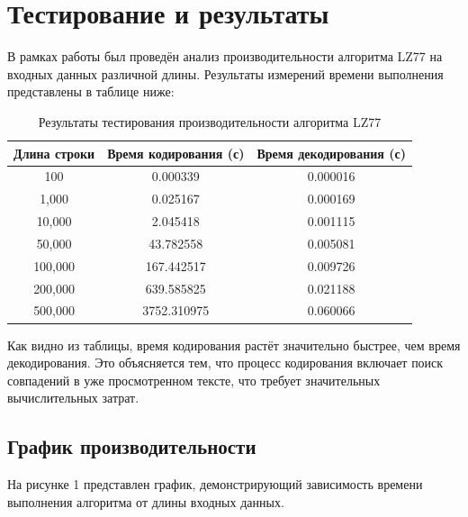 \section*{Тестирование и результаты}

В рамках работы был проведён анализ производительности алгоритма LZ77 на входных данных различной длины. Результаты измерений времени выполнения представлены в таблице ниже:

\begin{table}
\centering
\begin{tabular}{|c|c|c|}
\hline
\textbf{Длина строки} & \textbf{Время кодирования (с)} & \textbf{Время декодирования (с)} \\ \hline
100                  & 0.000339                       & 0.000016                         \\ \hline
1,000                & 0.025167                       & 0.000169                         \\ \hline
10,000               & 2.045418                       & 0.001115                         \\ \hline
50,000               & 43.782558                      & 0.005081                         \\ \hline
100,000              & 167.442517                     & 0.009726                         \\ \hline
200,000              & 639.585825                     & 0.021188                         \\ \hline
500,000              & 3752.310975                    & 0.060066                         \\ \hline
\end{tabular}
\caption{Результаты тестирования производительности алгоритма LZ77}
\label{tab:results}
\end{table}

\noindent Как видно из таблицы, время кодирования растёт значительно быстрее, чем время декодирования. Это объясняется тем, что процесс кодирования включает поиск совпадений в уже просмотренном тексте, что требует значительных вычислительных затрат.

\subsection*{График производительности}

На рисунке 1 представлен график, демонстрирующий зависимость времени выполнения алгоритма от длины входных данных. 

